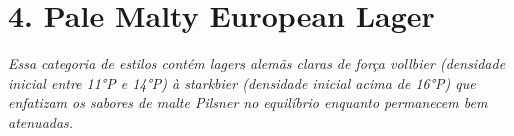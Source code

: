 \section*{4. Pale Malty European Lager}
\textit{Essa categoria de estilos contém lagers alemãs claras de força vollbier (densidade inicial entre 11°P e 14°P) à starkbier (densidade inicial acima de 16°P) que enfatizam os sabores de malte Pilsner no equilíbrio enquanto permanecem bem atenuadas.}

